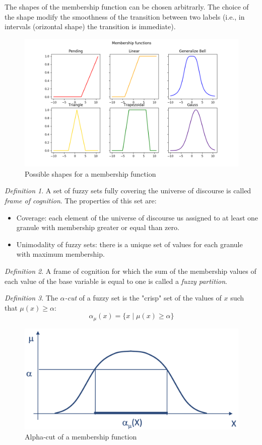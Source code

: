 \documentclass[12pt, a4paper]{report}
\theoremstyle{remark}
\newtheorem*{remark}{Definition}
\theoremstyle{definition}
\begin{document}
    The shapes of the membership function can be chosen arbitrarly. The choice of the shape modify the smoothness of the transition 
    between two labels (i.e., in intervals (orizontal shape) the transition is immediate). 
    \begin{figure}[H]
        \centering
        \includegraphics[width=0.75\linewidth]{images/shape.png}
        \caption{Possible shapes for a membership function}
    \end{figure}
    \begin{remark}
        A set of fuzzy sets fully covering the universe of discourse is called \emph{frame of cognition}. The properties of this set are:
        \begin{itemize}
            \item Coverage: each element of the universe of discourse us assigned to at least one granule with membership greater or equal 
                than zero.
            \item Unimodality of fuzzy sets: there is a unique set of values for each granule with maximum membership. 
        \end{itemize}
    \end{remark}
    \begin{remark}
        A frame of cognition for which the sum  of the membership values of each value of the base variable is equal to one is called 
        a \emph{fuzzy partition}. 
    \end{remark}
    \begin{remark}
        The \emph{$\alpha$-cut} of a fuzzy set is the "crisp" set of the values of $x$ such that $\mu(x) \geq \alpha$:
        \[\alpha_\mu(x)=\{x \mid \mu(x) \geq \alpha\}\]
    \end{remark}
    \begin{figure}[H]
        \centering
        \includegraphics[width=0.5\linewidth]{images/alpha.png}
        \caption{Alpha-cut of a membership function}
    \end{figure}
\end{document}
